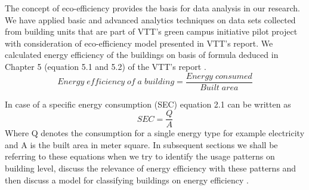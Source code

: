 The concept of eco-efficiency provides the basis for data analysis in our research. We have applied basic and advanced analytics techniques on data sets collected from building units that are part of VTT's green campus initiative pilot project with consideration of eco-efficiency model presented in VTT's report. We calculated energy efficiency of  the buildings on basis of formula deduced in Chapter 5 (equation 5.1 and 5.2) of the VTT's  report \cite{forsstrommeasuring}.
\begin{equation}
Energy\;efficiency\;of\;a\;building  =  \frac{Energy\;consumed}{Built\;area}
\end{equation}  

In case of a specific energy consumption (SEC) \cite{forsstrommeasuring} equation 2.1 can be written as 
\begin{equation}
SEC  = \frac{Q}{A}
\end{equation} 
Where Q denotes the consumption for a single energy type for example electricity and A is the built area in meter square. In subsequent sections we shall be  referring to these equations when we try to identify the usage patterns on building level, discuss the relevance of  energy efficiency with these patterns and then discuss a model for classifying buildings on energy efficiency .

